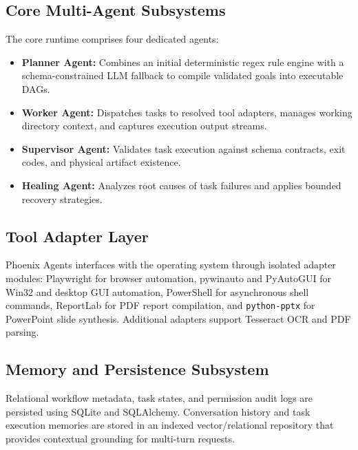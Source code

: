 \documentclass[conference]{IEEEtran}
\begin{document}
\subsection{Core Multi-Agent Subsystems}
The core runtime comprises four dedicated agents:
\begin{itemize}
    \item \textbf{Planner Agent:} Combines an initial deterministic regex rule engine with a schema-constrained LLM fallback to compile validated goals into executable DAGs.
    \item \textbf{Worker Agent:} Dispatches tasks to resolved tool adapters, manages working directory context, and captures execution output streams.
    \item \textbf{Supervisor Agent:} Validates task execution against schema contracts, exit codes, and physical artifact existence.
    \item \textbf{Healing Agent:} Analyzes root causes of task failures and applies bounded recovery strategies.
\end{itemize}

\subsection{Tool Adapter Layer}
Phoenix Agents interfaces with the operating system through isolated adapter modules: Playwright for browser automation, pywinauto and PyAutoGUI for Win32 and desktop GUI automation, PowerShell for asynchronous shell commands, ReportLab for PDF report compilation, and \texttt{python-pptx} for PowerPoint slide synthesis. Additional adapters support Tesseract OCR and PDF parsing.

\subsection{Memory and Persistence Subsystem}
Relational workflow metadata, task states, and permission audit logs are persisted using SQLite and SQLAlchemy. Conversation history and task execution memories are stored in an indexed vector/relational repository that provides contextual grounding for multi-turn requests.
\end{document}

